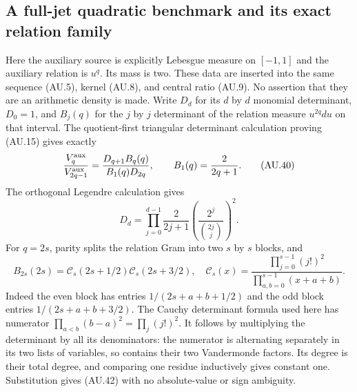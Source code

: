 \subsection{A full-jet quadratic benchmark and its exact relation family}

Here the auxiliary source is explicitly Lebesgue measure on $[-1,1]$
and the auxiliary relation is $u^q$. Its mass is two. These data are
inserted into the same sequence (AU.5), kernel (AU.8), and central
ratio (AU.9). No assertion that they are an arithmetic density is
made. Write $D_d$ for its $d$ by $d$ monomial determinant, $D_0=1$,
and $B_j(q)$ for the $j$ by $j$ determinant of the relation measure
$u^{2q}du$ on that interval. The quotient-first triangular determinant
calculation proving (AU.15) gives exactly
\[
 \frac{V_q^{\rm aux}}{V_{2q-1}^{\rm aux}}
       =\frac{D_{q+1}B_q(q)}{B_1(q)D_{2q}},\qquad
 B_1(q)=\frac2{2q+1}.                                    \tag{AU.40}
\]
The orthogonal Legendre calculation gives
\[
 D_d=\prod_{j=0}^{d-1}\frac{2}{2j+1}
         \left(\frac{2^j}{\binom{2j}{j}}\right)^2.        \tag{AU.41}
\]
For $q=2s$, parity splits the relation Gram into two $s$ by $s$
blocks, and
\[
 B_{2s}(2s)=\mathcal C_s(2s+1/2)\mathcal C_s(2s+3/2),
 \quad
 \mathcal C_s(x)=\frac{\prod_{j=0}^{s-1}(j!)^2}
                       {\prod_{a,b=0}^{s-1}(x+a+b)}.
 \tag{AU.42}
\]
Indeed the even block has entries $1/(2s+a+b+1/2)$ and the odd
block entries $1/(2s+a+b+3/2)$. The Cauchy determinant formula
used here has numerator $\prod_{a<b}(b-a)^2=\prod_j(j!)^2$.
It follows by multiplying the determinant by all its denominators:
the numerator is alternating separately in its two lists of variables,
so contains their two Vandermonde factors. Its degree is their total
degree, and comparing one residue inductively gives constant one.
Substitution gives (AU.42) with no absolute-value or sign ambiguity.


